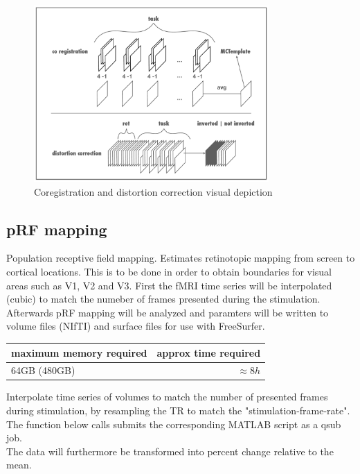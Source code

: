 \documentclass[12pt,a4paper]{scrartcl}
\begin{document}
\begin{figure}
\begin{center}
\includegraphics[width=0.8\textwidth]{coregdist}
\caption[Coregistration and distortion correction visual depiction]{Coregistration and distortion correction visual depiction}
\label{fig:coregdist}
\end{center}
\end{figure}

\subsection{pRF mapping}
Population receptive field mapping. Estimates retinotopic mapping from screen to cortical locations. This is to be done in order to obtain boundaries for visual areas such as V1, V2 and V3. First the fMRI time series will be interpolated (cubic) to match the numeber of frames presented during the stimulation. Afterwards pRF mapping will be analyzed and paramters will be written to volume files (NIfTI) and surface files for use with FreeSurfer.
\begin{table}[h]
\begin{tabular}{l | r}
\toprule
maximum memory required & approx time required\\\toprule
64GB (480GB) & $\approx 8h$ \\\bottomrule
\end{tabular}
\end{table}
\FloatBarrier
\noindent Interpolate time series of volumes to match the number of presented frames during stimulation, by resampling the TR to match the "stimulation-frame-rate". The function below calls submits the corresponding MATLAB script as a qsub job.\\
The data will furthermore be transformed into percent change relative to the mean.\\
\end{document}
